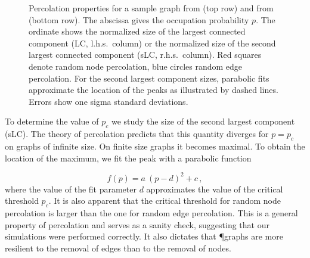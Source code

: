 		\begin{figure}
			\centering
			\qquad
			\newline
			\qquad

			
			\caption[Percolation properties]{Percolation properties for a sample graph from  (top row) and from  (bottom row). The abscissa gives the occupation probability $p$. The ordinate shows the normalized size of the largest connected component (LC, l.h.s.\ column) or the normalized size of the second largest connected component (sLC, r.h.s.\ column). Red squares denote random node percolation, blue circles random edge percolation. For the second largest component sizes, parabolic fits approximate the location of the peaks as illustrated by dashed lines. Errors show one sigma standard deviations.}
			\label{fig:percolation_observables}
		\end{figure}

		
		To determine the value of $p_c$ we study the size of the second largest component (sLC). The theory of percolation predicts that this quantity diverges for $p=p_c$ on graphs of infinite size. On finite size graphs it becomes maximal. To obtain the location of the maximum, we fit the peak with a parabolic function

		\begin{equation}
			f(p) = a \ (p-d)^2 + c\,,
		\end{equation}
		where the value of the fit parameter $d$ approximates the value of the critical threshold $p_c$. It is also apparent that the critical threshold for random node percolation is larger than the one for random edge percolation. This is a general property of percolation and serves as a sanity check, suggesting that our simulations were performed correctly. It also dictates that \P graphs are more resilient to the removal of edges than to the removal of nodes.

